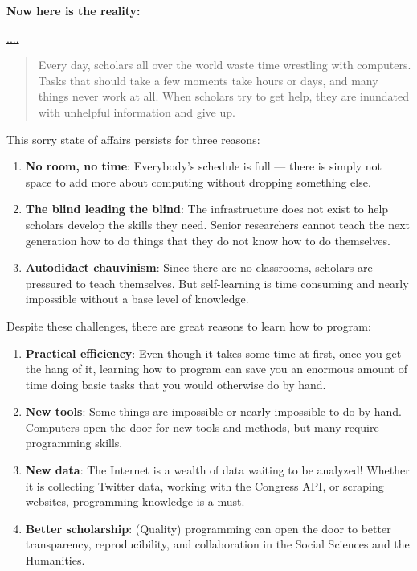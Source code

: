 \documentclass[]{book}
\begin{document}
\textbf{Now here is the reality:}

\url{....}

\begin{quote}
Every day, scholars all over the world waste time wrestling with
computers. Tasks that should take a few moments take hours or days, and
many things never work at all. When scholars try to get help, they are
inundated with unhelpful information and give up.
\end{quote}

This sorry state of affairs persists for three reasons:

\begin{enumerate}
\def\labelenumi{\arabic{enumi}.}
\item
  \textbf{No room, no time}: Everybody's schedule is full --- there is
  simply not space to add more about computing without dropping
  something else.
\item
  \textbf{The blind leading the blind}: The infrastructure does not
  exist to help scholars develop the skills they need. Senior
  researchers cannot teach the next generation how to do things that
  they do not know how to do themselves.
\item
  \textbf{Autodidact chauvinism}: Since there are no classrooms,
  scholars are pressured to teach themselves. But self-learning is time
  consuming and nearly impossible without a base level of knowledge.
\end{enumerate}

Despite these challenges, there are great reasons to learn how to
program:

\begin{enumerate}
\def\labelenumi{\arabic{enumi}.}
\item
  \textbf{Practical efficiency}: Even though it takes some time at
  first, once you get the hang of it, learning how to program can save
  you an enormous amount of time doing basic tasks that you would
  otherwise do by hand.
\item
  \textbf{New tools}: Some things are impossible or nearly impossible to
  do by hand. Computers open the door for new tools and methods, but
  many require programming skills.
\item
  \textbf{New data}: The Internet is a wealth of data waiting to be
  analyzed! Whether it is collecting Twitter data, working with the
  Congress API, or scraping websites, programming knowledge is a must.
\item
  \textbf{Better scholarship}: (Quality) programming can open the door
  to better transparency, reproducibility, and collaboration in the
  Social Sciences and the Humanities.
\end{enumerate}
\end{document}
